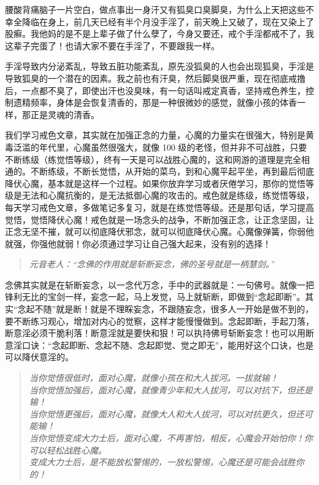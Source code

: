 \begin{case}
    腰酸背痛脑子一片空白，做点事出一身汗又有狐臭口臭脚臭，为什么上天把这些不幸全降临在身上，前几天已经有半个月没手淫了，前天晚上又破了，现在又染上了股癣。我他妈的是不是上辈子做了什么孽了，今身又要还，戒个手淫都戒不了，我这辈子完蛋了！也请大家不要在手淫了，不要跟我一样。
\end{case}

手淫导致内分泌紊乱，导致五脏功能紊乱，原先没狐臭的人也会出现狐臭，手淫是导致狐臭的一个潜在的因素。我之前也有汗臭，然后脚臭很严重，现在彻底戒撸后，一点都不臭了，即使出汗也没臭味，有一句话叫戒定真香，坚持戒色养生，控制遗精频率，身体是会恢复清香的，那是一种很微妙的感觉，就像小孩的体香一样，那正是灵魂的清香。

我们学习戒色文章，其实就在加强正念的力量，心魔的力量实在很强大，特别是黄毒泛滥的年代里，心魔虽然很强大，就像 100 级的老怪，但并非不可战胜，只要不断练级（练觉悟等级），终有一天是可以战胜心魔的，这和网游的道理是完全相通的。不断练级，不断长觉悟，从开始的菜鸟，到和心魔平起平坐，再到最后彻底降伏心魔，基本就是这样一个过程。如果你放弃学习或者厌倦学习，那你的觉悟等级是无法和心魔抗衡的，是无法抵御心魔的攻击的。戒色就是练级，练觉悟等级，每天学习戒色文章，多做笔记多复习，就是在练觉悟等级。还是那句话，学习提高觉悟，觉悟降伏心魔！戒色就是一场念头的战争，不断加强正念，让正念坚固，让正念无坚不摧，就可以彻底降伏邪念，就可以彻底降伏心魔。心魔像弹簧，你弱他就强，你强他就弱！你必须通过学习让自己强大起来，没有别的选择！

\begin{quote}\it
    元音老人：“念佛的作用就是斩断妄念，佛的圣号就是一柄慧剑。”
\end{quote}

念佛其实就是在斩断妄念，以一念代万念，手中的武器就是：一句佛号。就像一把锋利无比的宝剑一样，妄念一起，马上发觉，马上就斩断，即做到“念起即断”。其实“念起不随”就是断！就是不理睬妄念，不跟随妄念，很多人一开始是做不到的，要不断练习观心，增加对内心的觉察，这样才能慢慢做到。念起即断，手起刀落，断意淫必须干脆利落！断意淫就是要快和狠！可以执持佛号斩断妄念！也可以用断意淫口诀：“念起即断、念起不随、念起即觉、觉之即无”，能用好这个口诀，也是可以降伏意淫的。

\begin{quotation}\it
    当你觉悟很低时，面对心魔，就像小孩在和大人拔河。一拔就输！\\
    当你觉悟加强后，面对心魔，就像青少年和大人拔河，可以对抗下，但还是输！\\
    当你觉悟更强后，面对心魔，就像大人和大人拔河，可以对抗更久，但还可能输！\\
    当你觉悟变成大力士后，面对心魔，不再害怕，相反，心魔会开始怕你！你可以轻松战胜心魔。\\
    变成大力士后，是不能放松警惕的，一放松警惕，心魔还是可能会战胜你的！
\end{quotation}

